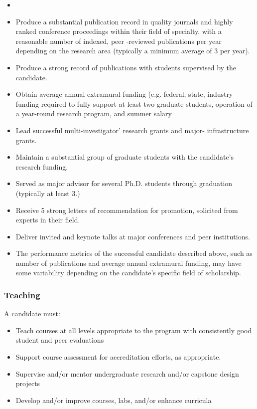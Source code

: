 \begin{itemize}
\item 
\item Produce a substantial publication record in quality journals and highly ranked conference proceedings within their field of specialty, with a reasonable number of indexed, peer -reviewed publications per year depending on the research area (typically a minimum average of 3 per year).
\item Produce a strong record of publications with students supervised by the candidate.
\item Obtain average annual extramural funding (e.g. federal, state, industry funding required to fully support at least two graduate students, operation of a year-round research program, and summer salary
\item Lead successful multi-investigator’ research grants and major- infrastructure grants.
\item Maintain a substantial group of graduate students with the candidate’s research funding.
\item Served as major advisor for several Ph.D. students through graduation (typically at least 3.)
\item Receive 5 strong letters of recommendation for promotion, solicited from experts in their field.
\item Deliver invited and keynote talks at major conferences and peer institutions.
\item The performance metrics of the successful candidate described above, such as number of publications and average annual extramural funding, may have some variability depending on the candidate’s specific field of scholarship.
\end{itemize}

\subsubsection*{Teaching}

A candidate must:

\begin{itemize}
\item Teach courses at all levels appropriate to the program with consistently good student and peer evaluations
\item Support course assessment for accreditation efforts, as appropriate.
\item Supervise and/or mentor undergraduate research and/or capstone design projects
\item Develop and/or improve courses, labs, and/or enhance curricula
\end{itemize}

